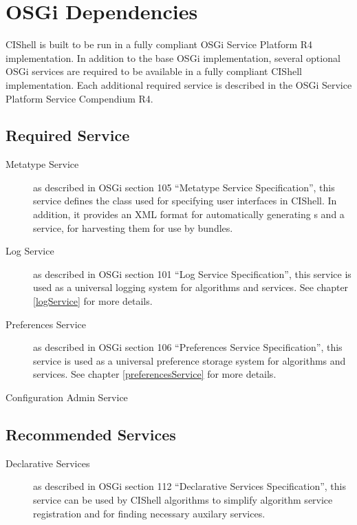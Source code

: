 \section{OSGi Dependencies}

CIShell is built to be run in a fully compliant OSGi Service Platform R4
implementation. In addition to the base OSGi implementation, several
optional OSGi services are required to be available in a fully compliant CIShell
implementation. Each additional required service is described in the OSGi
Service Platform Service Compendium R4.

\subsection*{Required Service}
\begin{description}
  \item[Metatype Service] as described in OSGi section 105 ``Metatype Service
  Specification'', this service defines the  class used
  for specifying user interfaces in CIShell. In addition, it provides an XML 
  format for automatically generating s and a service,
  for harvesting them for use by bundles.
  \item[Log Service] as described in OSGi section 101 ``Log Service 
  Specification'', this service is used as a universal logging system for 
  algorithms and services. See chapter \ref{logService} for more details.   
  \item[Preferences Service] as described in OSGi section 106 ``Preferences
  Service Specification'', this service is used as a universal preference storage
  system for algorithms and services. See chapter \ref{preferencesService} for
  more details.
  \item[Configuration Admin Service] 
\end{description}

\subsection*{Recommended Services}
\begin{description}
  
  \item[Declarative Services] as described in OSGi section 112 ``Declarative
  Services Specification'', this service can be used by CIShell algorithms to
  simplify algorithm service registration and for finding necessary auxilary services.\item[]
\end{description}
